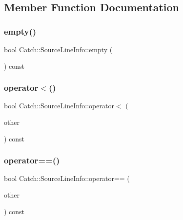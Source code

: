 \subsection{Member Function Documentation}
\mbox{\label{struct_catch_1_1_source_line_info_a05ab6444e9de7e9c3e76d8aa00093c3a}} 
\subsubsection{\texorpdfstring{empty()}{empty()}}
{\footnotesize\ttfamily bool Catch\+::\+Source\+Line\+Info\+::empty (\begin{DoxyParamCaption}{ }\end{DoxyParamCaption}) const}

\mbox{\label{struct_catch_1_1_source_line_info_a8b99a0d7b1553d8c2298c694db924be3}} 
\subsubsection{\texorpdfstring{operator$<$()}{operator<()}}
{\footnotesize\ttfamily bool Catch\+::\+Source\+Line\+Info\+::operator$<$ (\begin{DoxyParamCaption}\item[{\hyperlink{struct_catch_1_1_source_line_info}{Source\+Line\+Info} const \&}]{other }\end{DoxyParamCaption}) const}

\mbox{\label{struct_catch_1_1_source_line_info_a688e761986879266658f000f14ab8a42}} 
\subsubsection{\texorpdfstring{operator==()}{operator==()}}
{\footnotesize\ttfamily bool Catch\+::\+Source\+Line\+Info\+::operator== (\begin{DoxyParamCaption}\item[{\hyperlink{struct_catch_1_1_source_line_info}{Source\+Line\+Info} const \&}]{other }\end{DoxyParamCaption}) const}



